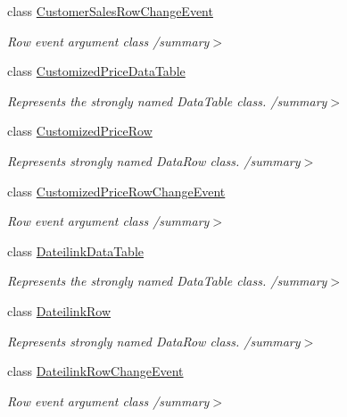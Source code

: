 \begin{DoxyCompactItemize}
class \hyperlink{class_products_1_1_data_1_1ds_sage_1_1_customer_sales_row_change_event}{Customer\+Sales\+Row\+Change\+Event}
\begin{DoxyCompactList}\small\item\em Row event argument class /summary$>$ \end{DoxyCompactList}\item 
class \hyperlink{class_products_1_1_data_1_1ds_sage_1_1_customized_price_data_table}{Customized\+Price\+Data\+Table}
\begin{DoxyCompactList}\small\item\em Represents the strongly named Data\+Table class. /summary$>$ \end{DoxyCompactList}\item 
class \hyperlink{class_products_1_1_data_1_1ds_sage_1_1_customized_price_row}{Customized\+Price\+Row}
\begin{DoxyCompactList}\small\item\em Represents strongly named Data\+Row class. /summary$>$ \end{DoxyCompactList}\item 
class \hyperlink{class_products_1_1_data_1_1ds_sage_1_1_customized_price_row_change_event}{Customized\+Price\+Row\+Change\+Event}
\begin{DoxyCompactList}\small\item\em Row event argument class /summary$>$ \end{DoxyCompactList}\item 
class \hyperlink{class_products_1_1_data_1_1ds_sage_1_1_dateilink_data_table}{Dateilink\+Data\+Table}
\begin{DoxyCompactList}\small\item\em Represents the strongly named Data\+Table class. /summary$>$ \end{DoxyCompactList}\item 
class \hyperlink{class_products_1_1_data_1_1ds_sage_1_1_dateilink_row}{Dateilink\+Row}
\begin{DoxyCompactList}\small\item\em Represents strongly named Data\+Row class. /summary$>$ \end{DoxyCompactList}\item 
class \hyperlink{class_products_1_1_data_1_1ds_sage_1_1_dateilink_row_change_event}{Dateilink\+Row\+Change\+Event}
\begin{DoxyCompactList}\small\item\em Row event argument class /summary$>$ \end{DoxyCompactList}\item 

\end{DoxyCompactItemize}
